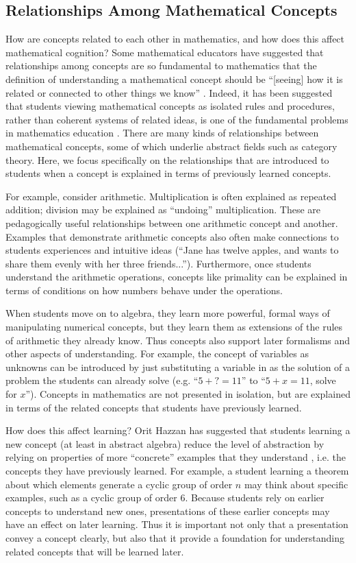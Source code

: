 \documentclass[man,10pt]{apa6}
\begin{document}
\subsection{Relationships Among Mathematical Concepts}
How are concepts related to each other in mathematics, and how does this affect mathematical cognition? Some mathematical educators have suggested that relationships among concepts are so fundamental to mathematics that the definition of understanding a mathematical concept should be ``[seeing] how it is related or connected to other things we know'' \cite{Hiebert1997}. Indeed, it has been suggested that students viewing mathematical concepts as isolated rules and procedures, rather than coherent systems of related ideas, is one of the fundamental problems in mathematics education \cite{Richland2012}. There are many kinds of relationships between mathematical concepts, some of which underlie abstract fields such as category theory. Here, we focus specifically on the relationships that are introduced to students when a concept is explained in terms of previously learned concepts. \par 
For example, consider arithmetic. Multiplication is often explained as repeated addition; division may be explained as ``undoing'' multiplication. These are pedagogically useful relationships between one arithmetic concept and another. Examples that demonstrate arithmetic concepts also often make connections to students experiences and intuitive ideas (``Jane has twelve apples, and wants to share them evenly with her three friends...''). Furthermore, once students understand the arithmetic operations, concepts like primality can be explained in terms of conditions on how numbers behave under the operations. \par
When students move on to algebra, they learn more powerful, formal ways of manipulating numerical concepts, but they learn them as extensions of the rules of arithmetic they already know. Thus concepts also support later formalisms and other aspects of understanding. For example, the concept of variables as unknowns can be introduced by just substituting a variable in as the solution of a problem the students can already solve (e.g. ``$5+?=11$'' to ``$5+x=11$, solve for $x$''). Concepts in mathematics are not presented in isolation, but are explained in terms of the related concepts that students have previously learned. \par 
How does this affect learning? Orit Hazzan has suggested that students learning a new concept (at least in abstract algebra) reduce the level of abstraction by relying on properties of more ``concrete'' examples that they understand \cite{Hazzan1999}, i.e. the concepts they have previously learned. For example, a student learning a theorem about which elements generate a cyclic group of order $n$ may think about specific examples, such as a cyclic group of order 6. Because students rely on earlier concepts to understand new ones, presentations of these earlier concepts may have an effect on later learning. Thus it is important not only that a presentation convey a concept clearly, but also that it provide a foundation for understanding related concepts that will be learned later. \par
\end{document}
